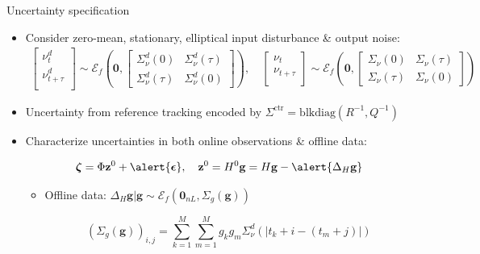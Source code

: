 \documentclass[smaller,aspectratio=169]{beamer}        %
\newcommand{\blkdiag}[1]{\mathrm{blkdiag}\left(#1\right)}
\newcommand{\ellip}[1]{\mathcal{E}_f\left(#1\right)}
\begin{document}
\begin{frame}{Uncertainty specification}
    \begin{itemize}
        \item Consider zero-mean, stationary, elliptical input disturbance \& output noise:
        \begin{align*}
            \begin{bmatrix}
                \nu_t^d\\
                \nu_{t+\tau}^d\\
            \end{bmatrix}
            \sim\ellip{\mathbf{0},
            \begin{bmatrix}
                \Sigma_\nu^d(0)&\Sigma_\nu^d(\tau)\\
                \Sigma_\nu^d(\tau)&\Sigma_\nu^d(0)
            \end{bmatrix}
            },\quad
            \begin{bmatrix}
                \nu_t\\
                \nu_{t+\tau}\\
            \end{bmatrix}
            \sim\ellip{\mathbf{0},
            \begin{bmatrix}
                \Sigma_\nu(0)&\Sigma_\nu(\tau)\\
                \Sigma_\nu(\tau)&\Sigma_\nu(0)
            \end{bmatrix}
            }
        \end{align*}
        \item Uncertainty from reference tracking encoded by $\Sigma^\mathrm{ctr}=\blkdiag{R^{-1},Q^{-1}}$
    \item Characterize uncertainties in both online observations \& offline data:

    \vspace{-0.7em}
    
    \[\boldsymbol{\zeta} = \Phi\mathbf{z}^0 + \alert{\boldsymbol{\epsilon}},\quad \mathbf{z}^0=H^0\mathbf{g}=H\mathbf{g}-\alert{\Delta_H\mathbf{g}}\]
    
    \begin{itemize}
        \item Offline data:        $\Delta_H\mathbf{g}|\mathbf{g}\sim\ellip{\mathbf{0}_{nL},\Sigma_g(\mathbf{g})}$

        \vspace{-0.5em}

        \[\left(\Sigma_g(\mathbf{g})\right)_{i,j}=\sum_{k=1}^M\sum_{m=1}^M g_{k}g_{m}\Sigma_\nu^d(|t_k+i-(t_m+j)|)\]
        

\end{itemize}
\end{itemize}
\end{frame}
\end{document}

